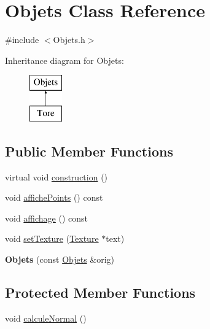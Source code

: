 \hypertarget{classObjets}{\section{Objets Class Reference}
\label{classObjets}
}


{\ttfamily \#include $<$Objets.\-h$>$}

Inheritance diagram for Objets\-:\begin{figure}[H]
\begin{center}
\leavevmode
\includegraphics[height=2.000000cm]{classObjets}
\end{center}
\end{figure}
\subsection*{Public Member Functions}
\begin{DoxyCompactItemize}
\item 
virtual void \hyperlink{classObjets_a2c14a4a3841d82cef1d1ef4e695859f6}{construction} ()
\item 
void \hyperlink{classObjets_a33ab9a220bba2d8266901b1302d5d0e6}{affiche\-Points} () const 
\item 
void \hyperlink{classObjets_a0897b019b260a1b858dffd4fa07595fb}{affichage} () const 
\item 
void \hyperlink{classObjets_af830ffcb0d208607b530c80a9403f084}{set\-Texture} (\hyperlink{classTexture}{Texture} $\ast$text)
\item 
\hypertarget{classObjets_a63d846ef70e1d0922f79e16d77f0c7cb}{{\bfseries Objets} (const \hyperlink{classObjets}{Objets} \&orig)}\label{classObjets_a63d846ef70e1d0922f79e16d77f0c7cb}

\end{DoxyCompactItemize}
\subsection*{Protected Member Functions}
\begin{DoxyCompactItemize}
\item 
void \hyperlink{classObjets_ae481b18cf3a384d177d62a101b8df518}{calcule\-Normal} ()
\end{DoxyCompactItemize}
